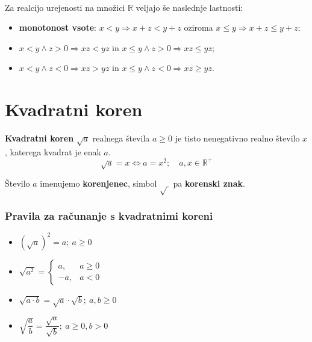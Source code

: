                 ~
            
                Za realcijo urejenosti na množici $\mathbb{R}$ veljajo še naslednje lastnosti:

                \begin{itemize}
                    \item \textbf{monotonost vsote}: $x<y \Rightarrow x+z<y+z$ oziroma $x\leq y \Rightarrow x+z\leq y+z$;
                    \item $x<y \land z>0 \Rightarrow xz<yz$ in $x\leq y \land z>0 \Rightarrow x z\leq y z$;
                    \item $x<y \land z<0 \Rightarrow xz>yz$ in $x\leq y \land z<0 \Rightarrow x z\geq y z$.
                \end{itemize}

            

        
\newpage


    \section{Kvadratni koren}

            
                \textbf{Kvadratni koren} $\sqrt{a}$ realnega števila $a\geq 0$ je tisto nenegativno realno število $x$,
                katerega kvadrat je enak $a$.
                $$\sqrt{a}=x \Leftrightarrow a=x^2; \quad a,x\in\mathbb{R}^+ $$

                Število $a$ imenujemo \textbf{korenjenec}, simbol $\sqrt{~}$ pa \textbf{korenski znak}.
            

            \subsubsection*{Pravila za računanje s kvadratnimi koreni}
                    
                        \begin{itemize}
                            \item $\left(\sqrt{a}\right)^2=a; ~a\geq 0$
                            \item $\sqrt{a^2}=\begin{cases}
                                a, & a\geq 0 \\
                                -a, & a<0
                            \end{cases}$
                            \item $\sqrt{a\cdot b}=\sqrt{a}\cdot\sqrt{b}; ~a,b\geq 0$
                            \item $\sqrt{\dfrac{a}{b}}=\dfrac{\sqrt{a}}{\sqrt{b}}; ~a\geq 0, b>0$
                        \end{itemize}
                    
